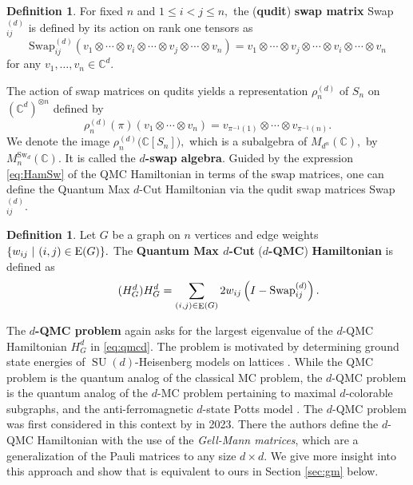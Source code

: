 \documentclass[12pt,dvipsnames,accepted=2016-08-18,a4paper,onecolumn]{quantumarticle}
\DeclareMathOperator{\EE}{E}
\numberwithin{equation}{section}
\newcommand{\CC}{\mathbb C}
\theoremstyle{definition}
\newtheorem{definition}[theorem]{Definition}
\begin{document}
\begin{definition} For fixed $n$ and $1\leq i < j \leq n,$ the (\textbf{qudit}) \textbf{swap matrix} Swap$_{ij}^{(d)}$  is defined by its action on rank one tensors as
	$$
	\text{Swap}_{ij}^{(d)}(v_1 \otimes \cdots \otimes v_i \otimes \cdots \otimes v_j \otimes \cdots \otimes v_n) = v_1 \otimes \cdots \otimes v_j \otimes \cdots \otimes v_i \otimes \cdots \otimes v_n
	$$
 for any $v_1, \ldots, v_n \in \CC^d.$
\end{definition}

	The action of swap matrices on qudits yields a representation $\rho_n^{(d)}$ of $S_n$ on $(\mathbb{C}^d)^{\otimes n}$ defined by
	$$
	\rho_n^{(d)}(\pi) (v_1 \otimes \cdots \otimes v_n) = v_{\pi^{-1}(1)} \otimes \cdots \otimes v_{\pi^{-1}(n)}.
	$$
	We denote the image $\rho_n^{(d)}\big(\CC[S_n] \big),$ which is a subalgebra of $M_{d^n}(\CC),$ by $M^{\text{Sw}_d}_n(\mathbb{C}).$ It is called the \textbf{$d$-swap algebra}. Guided by the expression \eqref{eq:HamSw} of the QMC Hamiltonian in terms of the swap matrices, one can define the Quantum Max $d$-Cut Hamiltonian via the qudit swap matrices Swap$^{(d)}_{ij}.$

\begin{definition}
     Let $G$ be a graph on $n$ vertices and edge weights $\{w_{ij} \ | \ (i,j) \in \textnormal{E}(G)\}.$  The \textbf{Quantum Max $d$-Cut} (\textbf{$d$-QMC}) \textbf{Hamiltonian} is defined as
    \begin{equation}\label{eq:qmcd}\tag{$H_G^d$}
        H_G^{d} = \sum_{(i,j) \in \EE(G)} 2 w_{ij} \left(I - \textnormal{Swap}^{(d)}_{ij}\right).
    \end{equation}
\end{definition}

The \textbf{$d$-QMC problem} again asks for the largest eigenvalue of the $d$-QMC Hamiltonian $H_G^d$ in \eqref{eq:qmcd}. 
The problem is motivated by determining ground state energies of $\operatorname{SU}(d)$-Heisenberg models on lattices \cite{KT,BAMC,PM21}.
While the QMC problem is the quantum analog of the classical MC problem, the $d$-QMC problem is the quantum analog of the $d$-MC problem pertaining to maximal $d$-colorable subgraphs, and the anti-ferromagnetic $d$-state Potts model \cite{FJ}. 
The $d$-QMC problem was first considered in this context by \cite{CJKKW23+} in 2023.
There the authors define the $d$-QMC Hamiltonian  with the use of the \textit{Gell-Mann matrices}, which are a generalization of the Pauli matrices to any size $d \times d.$ We give more insight into this approach 
and show that is equivalent to ours in Section \ref{sec:gm} below.
\end{document}
